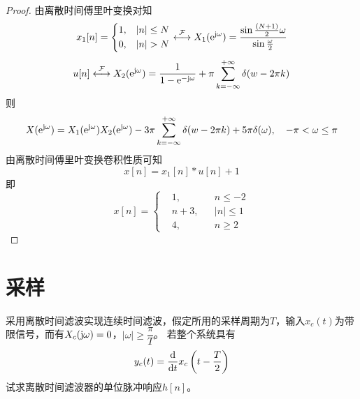 \begin{proof}
    
    由离散时间傅里叶变换对知
    $$x_1[n] = \left\{
        \begin{aligned}
            & 1, & |n| \leq N \\
            & 0, & |n| > N 
        \end{aligned}
        \right. \stackrel{\mathcal{F}}{\longleftrightarrow} X_1(\mathrm{e}^{\mathrm{j} \omega})  = \dfrac{\sin{\frac{(N + 1)}{2}\omega}}{\sin{\frac{\omega}{2}}}$$ 
    $$u[n] \stackrel{\mathcal{F}}{\longleftrightarrow} X_2(\mathrm{e}^{\mathrm{j} \omega}) = \dfrac{1}{1 - \mathrm{e}^{-\mathrm{j} \omega}} + \pi\sum\limits_{k = -\infty}^{+\infty}{\delta(w - 2\pi k)}$$
    则
    $$X(\mathrm{e}^{\mathrm{j} \omega}) = X_1(\mathrm{e}^{\mathrm{j} \omega}) X_2(\mathrm{e}^{\mathrm{j} \omega}) - 3\pi\sum\limits_{k = -\infty}^{+\infty}{\delta(w - 2\pi k)} + 5\pi\delta(\omega), \quad -\pi < \omega \leq \pi$$
    由离散时间傅里叶变换卷积性质可知
    $$x[n] = x_1[n] \ast u[n] + 1$$
    即
    $$x[n] = \left\{
        \begin{aligned}
            & 1, && n \leq -2 \\
            & n + 3, && |n| \leq 1 \\
            & 4, && n \geq 2 
        \end{aligned}
        \right. 
    $$

\end{proof}

\section{采样}

\begin{proposition}

    采用离散时间滤波实现连续时间滤波，假定所用的采样周期为$T$，输入$x_c(t)$为带限信号，而有$X_c(\mathrm{j} \omega) = 0$，$|\omega| \geq \dfrac{\pi}{T}$。
    若整个系统具有
    $$y_c(t) = \dfrac{\mathrm{d}}{\mathrm{d} t}x_c\left(t - \dfrac{T}{2}\right)$$
    试求离散时间滤波器的单位脉冲响应$h[n]$。

\end{proposition}

